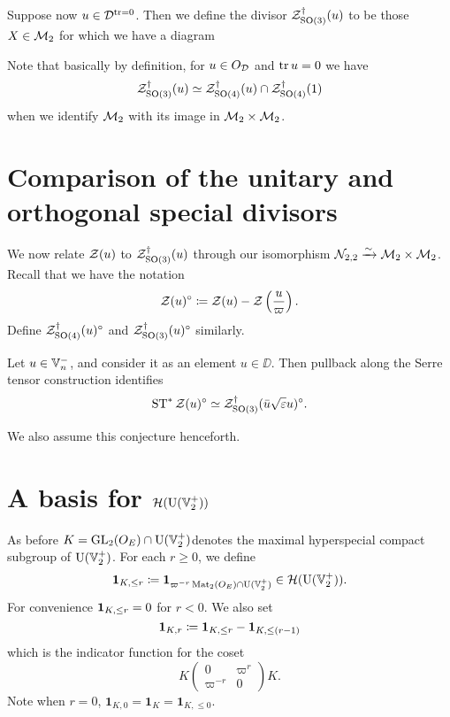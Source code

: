 \begin{definition}
  Suppose now $u \in \mathcal D^{\operatorname{tr} = 0}$.
  Then we define the divisor $\mathcal Z^{\dagger}_{\operatorname{SO}(3)}(u)$ to be those $X \in \mathcal M_2$
  for which we have a diagram
  \begin{center}
  \end{center}
  Note that basically by definition, for $u \in O_\mathcal D$ and $\operatorname{tr} u = 0$ we have
  \[ \mathcal Z^{\dagger}_{\operatorname{SO}(3)}(u) \simeq \mathcal Z^{\dagger}_{\operatorname{SO}(4)}(u) \cap \mathcal Z^{\dagger}_{\operatorname{SO}(4)}(1) \]
  when we identify $\mathcal M_2$ with its image in $\mathcal M_2 \times \mathcal M_2$.
\end{definition}

\section{Comparison of the unitary and orthogonal special divisors}
We now relate $\mathcal Z(u)$ to $\mathcal Z^{\dagger}_{\operatorname{SO}(3)}(u)$ through our
isomorphism $\mathcal N_{2,2} \xrightarrow{\sim} \mathcal M_2 \times \mathcal M_2$.
Recall that we have the notation
\[ \mathcal Z(u)^\circ \coloneqq \mathcal Z(u) - \mathcal Z\left( \frac{u}{\varpi} \right). \]
Define $\mathcal Z^{\dagger}_{\operatorname{SO}(4)}(u)^\circ$ and $\mathcal Z^{\dagger}_{\operatorname{SO}(3)}(u)^\circ$ similarly.

\begin{conjecture}
  \label{conj:serre_pullback_divisor}
  Let $u \in \mathbb V_n^-$, and consider it as an element $u \in \DD$.
  Then pullback along the Serre tensor construction identifies
  \[ \operatorname{ST}^\ast \mathcal Z(u)^\circ \simeq \mathcal Z^{\dagger}_{\operatorname{SO}(3)}(\bar u \sqrt{\varepsilon} u)^\circ. \]
\end{conjecture}
We also assume this conjecture henceforth.

\section{A basis for $\mathcal H(\operatorname{U}(\mathbb V_2^+))$}
\label{sec:hecke_unitary_basis}

As before $K = \operatorname{GL}_2(O_E) \cap \operatorname{U}(\mathbb V_2^+)$denotes the maximal hyperspecial compact subgroup of $\operatorname{U}(\mathbb V_2^+)$.
For each $r \ge 0$, we define
\[ \mathbf{1}_{K, \le r} \coloneqq \mathbf{1}_{\varpi^{-r} \operatorname{Mat}_2(O_E) \cap \operatorname{U}(\mathbb V_2^+)} \in \mathcal H(\operatorname{U}(\mathbb V_2^+)). \]
For convenience $\mathbf{1}_{K, \le r} = 0$ for $r < 0$.
We also set
\[  \mathbf{1}_{K, r} \coloneqq \mathbf{1}_{K, \le r} - \mathbf{1}_{K, \le (r-1)} \]
which is the indicator function for the coset
\[ K \begin{pmatrix} 0 & \varpi^r \\ \varpi^{-r} & 0 \end{pmatrix} K. \]
Note when $r = 0$, $\mathbf{1}_{K, 0} = \mathbf{1}_K = \mathbf{1}_{K, \le 0}$.

